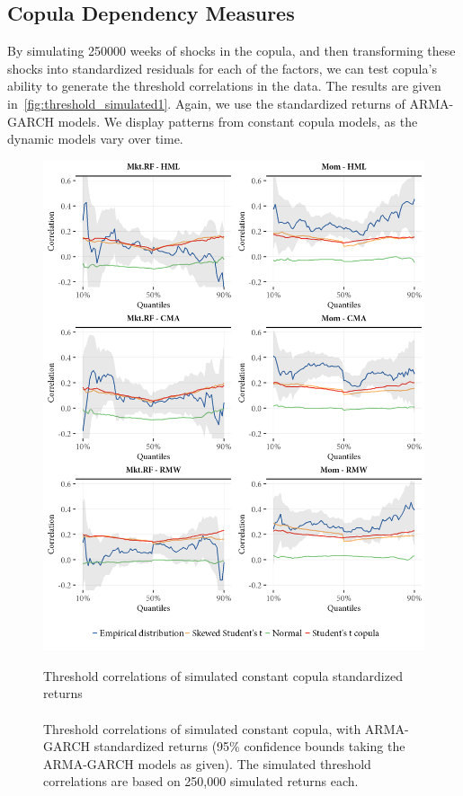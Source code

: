 
\subsection{Copula Dependency Measures} %
\label{sub:copula_dependency_measures}

By simulating 250000 weeks of shocks in the copula, and then transforming these shocks into standardized residuals for each of the factors, we can test copula's ability to generate the threshold correlations in the data. The results are given in~\autoref{fig:threshold_simulated1}. Again, we use the standardized returns of ARMA-GARCH models. We display patterns from constant copula models, as the dynamic models vary over time.

\begin{figure}[!ht]
  \centering
  \caption{Threshold correlations of simulated constant copula standardized returns \\ \quad \\ Threshold correlations of simulated constant copula, with ARMA-GARCH standardized returns (95\% confidence bounds taking the ARMA-GARCH models as given). The simulated threshold correlations are based on 250,000 simulated returns each.}
  \includegraphics[scale=1]{graphics/threshold_simulated_1.png}  
  \label{fig:threshold_simulated1}
\end{figure}
